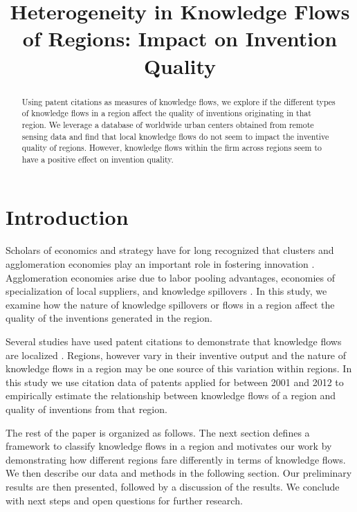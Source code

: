 \documentclass[12pt,letterpaper]{article}
\begin{document}
\setlength{\droptitle}{-5em}
\title{\textbf{\large Heterogeneity in Knowledge Flows of Regions: Impact on Invention Quality}}
\date{\vspace{-12ex}}

\maketitle
\thispagestyle{empty}
\renewcommand{\abstractname}{\normalsize ABSTRACT}
\begin{abstract}
\normalsize
\noindent Using patent citations as measures of knowledge flows, we explore if the different types of knowledge flows in a region affect the quality of inventions originating in that region. We leverage a database of worldwide urban centers  obtained from remote sensing data and find that  local knowledge flows  do not seem to impact the inventive quality of regions. However, knowledge flows within the firm across regions seem to have a positive effect on invention quality.
\end{abstract}

\newpage
\pagestyle{fancy}
\fancyhf{}
\rhead{\thepage}

\section*{Introduction}
Scholars of economics and strategy have for long recognized that clusters and agglomeration economies play an important role in fostering innovation \citep{Marshall1890, Porter1990}. Agglomeration economies arise due to labor pooling advantages, economies of specialization of local suppliers, and knowledge spillovers \citep{Porter1990, Krugman1991a}. In this study, we examine how the nature of knowledge spillovers or flows in a region affect the quality of the inventions generated in the region.\par
Several studies have used patent citations to demonstrate that knowledge flows are localized \citep*{Jaffe1993, Almeida1999, Alcacer2006a}. Regions, however vary in their inventive output \citep*{Agrawal2014} and the nature of knowledge flows in a region may be one source of this variation within regions. In this study we use citation data of patents applied for between 2001 and 2012 to empirically estimate the relationship between knowledge flows of a region and quality of inventions from that region. \par
The rest of the paper is organized as follows. The next section defines a framework to classify knowledge flows in a region and motivates our work by demonstrating how different regions fare differently in terms of knowledge flows. We then describe our data and methods in the following section. Our preliminary results are then presented, followed by a discussion of the results. We conclude with next steps and open questions for further research.
\end{document}
